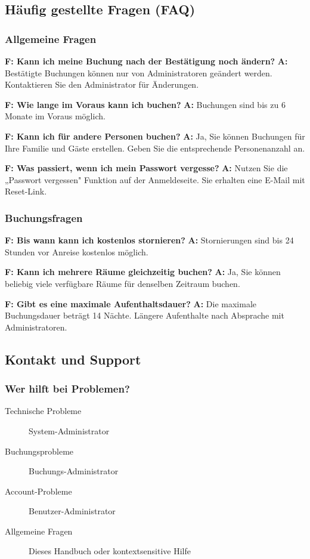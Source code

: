 \subsection{Häufig gestellte Fragen (FAQ)}

\subsubsection{Allgemeine Fragen}

\textbf{F: Kann ich meine Buchung nach der Bestätigung noch ändern?}
\textbf{A:} Bestätigte Buchungen können nur von Administratoren geändert werden. Kontaktieren Sie den Administrator für Änderungen.

\textbf{F: Wie lange im Voraus kann ich buchen?}
\textbf{A:} Buchungen sind bis zu 6 Monate im Voraus möglich.

\textbf{F: Kann ich für andere Personen buchen?}
\textbf{A:} Ja, Sie können Buchungen für Ihre Familie und Gäste erstellen. Geben Sie die entsprechende Personenanzahl an.

\textbf{F: Was passiert, wenn ich mein Passwort vergesse?}
\textbf{A:} Nutzen Sie die „Passwort vergessen" Funktion auf der Anmeldeseite. Sie erhalten eine E-Mail mit Reset-Link.

\subsubsection{Buchungsfragen}

\textbf{F: Bis wann kann ich kostenlos stornieren?}
\textbf{A:} Stornierungen sind bis 24 Stunden vor Anreise kostenlos möglich.

\textbf{F: Kann ich mehrere Räume gleichzeitig buchen?}
\textbf{A:} Ja, Sie können beliebig viele verfügbare Räume für denselben Zeitraum buchen.

\textbf{F: Gibt es eine maximale Aufenthaltsdauer?}
\textbf{A:} Die maximale Buchungsdauer beträgt 14 Nächte. Längere Aufenthalte nach Absprache mit Administratoren.

\subsection{Kontakt und Support}

\subsubsection{Wer hilft bei Problemen?}

\begin{description}
    \item[Technische Probleme] System-Administrator
    \item[Buchungsprobleme] Buchungs-Administrator
    \item[Account-Probleme] Benutzer-Administrator
    \item[Allgemeine Fragen] Dieses Handbuch oder kontextsensitive Hilfe
\end{description}


